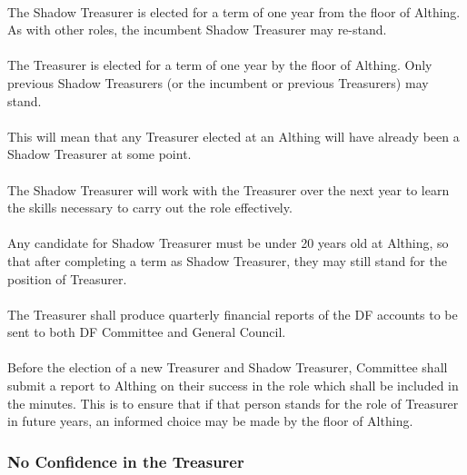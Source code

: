 \documentclass[a4paper, 12pt]{report}
\begin{document}
\paragraph{}
The Shadow Treasurer is elected for a term of one year from the floor of Althing. As with other roles, the incumbent Shadow Treasurer may re-stand.
\paragraph{}
The Treasurer is elected for a term of one year by the floor of Althing. Only previous Shadow Treasurers (or the incumbent or previous Treasurers) may stand.
\paragraph{}
This will mean that any Treasurer elected at an Althing will have already been a Shadow Treasurer at some point.
\paragraph{}
The Shadow Treasurer will work with the Treasurer over the next year to learn the skills necessary to carry out the role effectively.
\paragraph{}
Any candidate for Shadow Treasurer must be under 20 years old at Althing, so that after completing a term as Shadow Treasurer, they may still stand for the position of Treasurer.
\paragraph{}
The Treasurer shall produce quarterly financial reports of the DF accounts to be sent to both DF Committee and General Council.
\paragraph{}
\label{sec:treasurerreport}
Before the election of a new Treasurer and Shadow Treasurer, Committee shall submit a report to Althing on their success in the role which shall be included in the minutes. This is to ensure that if that person stands for the role of Treasurer in future years, an informed choice may be made by the floor of Althing.
\subsubsection{No Confidence in the Treasurer}
\label{sec:treasurernoconfidence}
\end{document}
